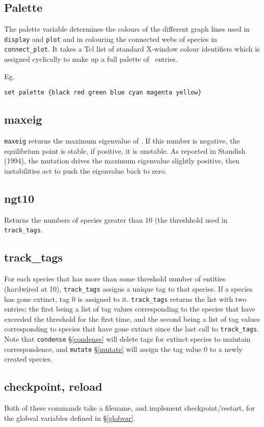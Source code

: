 \subsection{Palette}

The palette variable determines the colours of the different graph
lines used in \verb|display| and \verb|plot| and in colouring the
connected webs of species in \verb|connect_plot|. It takes a Tcl list
of standard X-window colour identifiers which is assigned cyclically
to make up a full palette of \nsp\ entries.

Eg.
\begin{verbatim}
set palette {black red green blue cyan magenta yellow}
\end{verbatim}

\subsection{maxeig}\label{maxeig}

\verb|maxeig| returns the maximum eigenvalue of \bbeta. If this number
is negative, the equilibrium point is stable, if positive, it is
unstable. As reported in Standish (1994)\cite{Standish94}, the mutation
drives the maximum eigenvalue slightly positive, then instabilities
act to push the eigenvalue back to zero.

\subsection{ngt10}

Returns the numbers of species greater than 10 (the threshhold used in
\verb|track_tags|.

\subsection{track\_tags}\label{track_tags}

For each species that has more than some threshold number of entities
(hardwired at 10), \verb|track_tags| assigns a unique tag to that
species. If a species has gone extinct, tag 0 is assigned to it.
\verb|track_tags| returns the list with two entries; the first being a
list of tag values corresponding to the species that have exceeded the
threshold for the first time, and the second being a list of tag
values corresponding to species that have gone extinct since the last
call to \verb|track_tags|. Note that \verb|condense| \S\ref{condense}
will delete tags for extinct species to maintain correspondence, and
\verb|mutate| \S\ref{mutate} will assign the tag value 0 to a newly
created species.

\subsection{checkpoint, reload}\label{checkpoint}

Both of these commands take a filename, and implement
checkpoint/restart, for the globval variables defined in \S\ref{globvar}.

